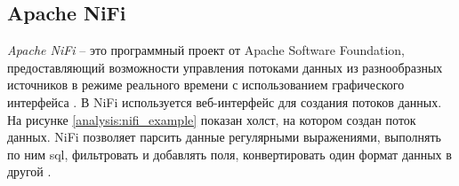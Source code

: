 \begin{figure}[ht!]
\end{figure}

\newpage

\subsection{Apache NiFi}

\textit{Apache NiFi} -- это программный проект от Apache Software Foundation, %
предоставляющий возможности управления потоками 
данных из разнообразных источников в режиме реального времени с использованием графического интерфейса \cite{bib4}. 
В NiFi используется веб-интерфейс для создания потоков данных.
На рисунке \ref{analysis:nifi_example} показан холст, на котором создан поток данных.
NiFi позволяет парсить данные регулярными выражениями, выполнять по ним sql, 
фильтровать и добавлять поля, конвертировать один формат данных в другой \cite{bib11}. 

\begin{figure}[ht!]
\end{figure}


